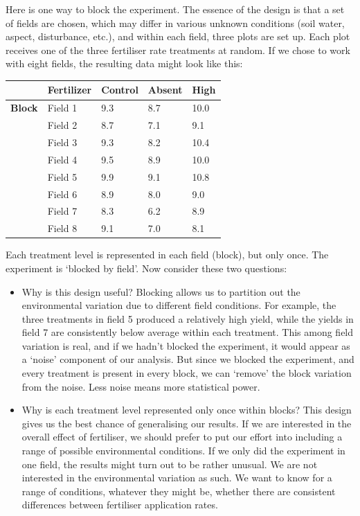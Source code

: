 \documentclass[
]{book}
\begin{document}
Here is one way to block the experiment. The essence of the design is that a set of fields are chosen, which may differ in various unknown conditions (soil water, aspect, disturbance, etc.), and within each field, three plots are set up. Each plot receives one of the three fertiliser rate treatments at random. If we chose to work with eight fields, the resulting data might look like this:

\begin{longtable}[]{@{}rllll@{}}
\toprule
& \textbf{Fertilizer} & Control & Absent & High \\
\midrule
\endhead
\textbf{Block} & Field 1 & 9.3 & 8.7 & 10.0 \\
& Field 2 & 8.7 & 7.1 & 9.1 \\
& Field 3 & 9.3 & 8.2 & 10.4 \\
& Field 4 & 9.5 & 8.9 & 10.0 \\
& Field 5 & 9.9 & 9.1 & 10.8 \\
& Field 6 & 8.9 & 8.0 & 9.0 \\
& Field 7 & 8.3 & 6.2 & 8.9 \\
& Field 8 & 9.1 & 7.0 & 8.1 \\
\bottomrule
\end{longtable}

Each treatment level is represented in each field (block), but only once. The experiment is `blocked by field'. Now consider these two questions:

\begin{itemize}
\item
  Why is this design useful? Blocking allows us to partition out the environmental variation due to different field conditions. For example, the three treatments in field 5 produced a relatively high yield, while the yields in field 7 are consistently below average within each treatment. This among field variation is real, and if we hadn't blocked the experiment, it would appear as a `noise' component of our analysis. But since we blocked the experiment, and every treatment is present in every block, we can `remove' the block variation from the noise. Less noise means more statistical power.
\item
  Why is each treatment level represented only once within blocks? This design gives us the best chance of generalising our results. If we are interested in the overall effect of fertiliser, we should prefer to put our effort into including a range of possible environmental conditions. If we only did the experiment in one field, the results might turn out to be rather unusual. We are not interested in the environmental variation as such. We want to know for a range of conditions, whatever they might be, whether there are consistent differences between fertiliser application rates.
\end{itemize}
\end{document}

